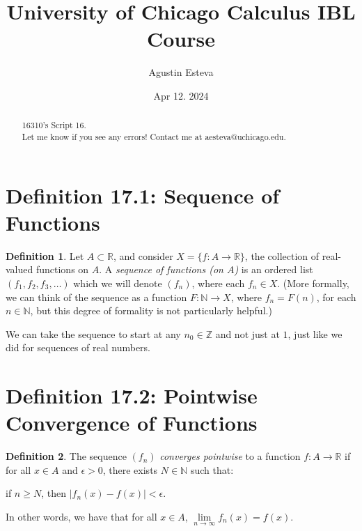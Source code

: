 \documentclass[openany, amssymb, psamsfonts]{amsart}
\title{University of Chicago Calculus IBL Course}
\author{Agustin Esteva}
\date{Apr 12. 2024}
\newcommand{\bbN}{\mathbb{N}}
\newcommand{\bbR}{\mathbb{R}}
\newcommand{\bbZ}{\mathbb{Z}}
\newcommand{\abs}[1]{\lvert #1 \rvert}
\theoremstyle{definition}
\newtheorem{defn}{Definition}[section]
\numberwithin{equation}{section}
\begin{document}
\begin{abstract}

16310's Script 16.\\ Let me know if you see any errors! Contact me at aesteva@uchicago.edu.


\end{abstract}

\maketitle

\tableofcontents

\setcounter{section}{17}

\section*{Definition 17.1: Sequence of Functions}
\begin{defn}
\label{17.1}
	Let $A\subset\bbR$, and consider $X = \{f\colon A \to \bbR \}$, the collection of real-valued functions on $A$. A \emph{sequence of functions (on $A$)} is an ordered list $(f_1, f_2, f_3, \ldots)$ which we will denote $(f_n)$, 
	where each $f_n \in X$. (More formally, we can think of the sequence as a function $F\colon \bbN \to X$, where $f_n = F(n)$, for each $n \in \bbN$, but this degree of formality is not particularly helpful.) 
	
	We can take the sequence to start at any $n_0 \in \bbZ$ and not just at $1$, just like we did for sequences of real numbers.
\end{defn}

\section*{Definition 17.2: Pointwise Convergence of Functions}
\begin{defn}
\label{17.2}
	The sequence $(f_n)$ \emph{converges pointwise} to a function $f\colon A \to \bbR$ if for all $x \in A$ and $\epsilon > 0$, there exists $N \in \bbN$ such that:
	\begin{center}
		if $ n \geq N$, \quad then $\abs{f_n(x) - f(x)} < \epsilon$.
	\end{center}
	In other words, we have that for all $x \in A$, $\lim\limits_{n \to \infty} f_n(x) = f(x)$.
\end{defn}
\end{document}
